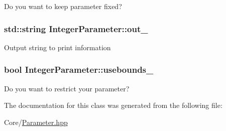 Do you want to keep parameter fixed? \hypertarget{class_integer_parameter_abf6356e2879d6f09f45a52d65844998f}{
\subsubsection[{out\-\_\-}]{\setlength{\rightskip}{0pt plus 5cm}std\-::string Integer\-Parameter\-::out\-\_\-\hspace{0.3cm}{\ttfamily [protected]}}}\label{class_integer_parameter_abf6356e2879d6f09f45a52d65844998f}
Output string to print information \hypertarget{class_integer_parameter_ab68632ed3d270b082ebfb16de643e3df}{
\subsubsection[{usebounds\-\_\-}]{\setlength{\rightskip}{0pt plus 5cm}bool Integer\-Parameter\-::usebounds\-\_\-\hspace{0.3cm}{\ttfamily [protected]}}}\label{class_integer_parameter_ab68632ed3d270b082ebfb16de643e3df}
Do you want to restrict your parameter? 

The documentation for this class was generated from the following file\-:\begin{DoxyCompactItemize}
\item 
Core/\hyperlink{_parameter_8hpp}{Parameter.\-hpp}\end{DoxyCompactItemize}
